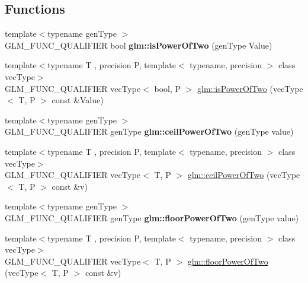 \subsection*{Functions}
\begin{DoxyCompactItemize}
\item 
\mbox{\label{round_8inl_a2e60d24d864637d3ebd62e6fa4941613}} 
{\footnotesize template$<$typename gen\+Type $>$ }\\G\+L\+M\+\_\+\+F\+U\+N\+C\+\_\+\+Q\+U\+A\+L\+I\+F\+I\+ER bool {\bfseries glm\+::is\+Power\+Of\+Two} (gen\+Type Value)
\item 
{\footnotesize template$<$typename T , precision P, template$<$ typename, precision $>$ class vec\+Type$>$ }\\G\+L\+M\+\_\+\+F\+U\+N\+C\+\_\+\+Q\+U\+A\+L\+I\+F\+I\+ER vec\+Type$<$ bool, P $>$ \hyperlink{group__gtc__round_gad454e4c8d8cd73ddc7de855f733a1465}{glm\+::is\+Power\+Of\+Two} (vec\+Type$<$ T, P $>$ const \&Value)
\item 
\mbox{\label{round_8inl_a15ad0f1b70561471f34bc2e43469424e}} 
{\footnotesize template$<$typename gen\+Type $>$ }\\G\+L\+M\+\_\+\+F\+U\+N\+C\+\_\+\+Q\+U\+A\+L\+I\+F\+I\+ER gen\+Type {\bfseries glm\+::ceil\+Power\+Of\+Two} (gen\+Type value)
\item 
{\footnotesize template$<$typename T , precision P, template$<$ typename, precision $>$ class vec\+Type$>$ }\\G\+L\+M\+\_\+\+F\+U\+N\+C\+\_\+\+Q\+U\+A\+L\+I\+F\+I\+ER vec\+Type$<$ T, P $>$ \hyperlink{group__gtc__round_ga76ec9b214ea1376fe09a903e34bab847}{glm\+::ceil\+Power\+Of\+Two} (vec\+Type$<$ T, P $>$ const \&v)
\item 
\mbox{\label{round_8inl_ac1385510b859757901e927c43bf4f329}} 
{\footnotesize template$<$typename gen\+Type $>$ }\\G\+L\+M\+\_\+\+F\+U\+N\+C\+\_\+\+Q\+U\+A\+L\+I\+F\+I\+ER gen\+Type {\bfseries glm\+::floor\+Power\+Of\+Two} (gen\+Type value)
\item 
{\footnotesize template$<$typename T , precision P, template$<$ typename, precision $>$ class vec\+Type$>$ }\\G\+L\+M\+\_\+\+F\+U\+N\+C\+\_\+\+Q\+U\+A\+L\+I\+F\+I\+ER vec\+Type$<$ T, P $>$ \hyperlink{group__gtc__round_ga6a5a8f6dd1b2f755e4572bd039062c37}{glm\+::floor\+Power\+Of\+Two} (vec\+Type$<$ T, P $>$ const \&v)

\end{DoxyCompactItemize}
